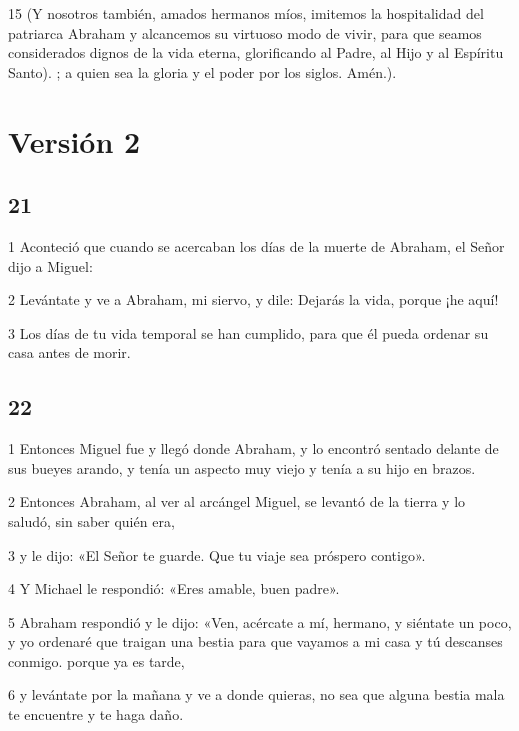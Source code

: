 \par 15 (Y nosotros también, amados hermanos míos, imitemos la hospitalidad del patriarca Abraham y alcancemos su virtuoso modo de vivir, para que seamos considerados dignos de la vida eterna, glorificando al Padre, al Hijo y al Espíritu Santo). ; a quien sea la gloria y el poder por los siglos. Amén.).

\part{Versión 2}

\chapter{21}

\par 1 Aconteció que cuando se acercaban los días de la muerte de Abraham, el Señor dijo a Miguel:

\par 2 Levántate y ve a Abraham, mi siervo, y dile: Dejarás la vida, porque ¡he aquí!

\par 3 Los días de tu vida temporal se han cumplido, para que él pueda ordenar su casa antes de morir.

\chapter{22}

\par 1 Entonces Miguel fue y llegó donde Abraham, y lo encontró sentado delante de sus bueyes arando, y tenía un aspecto muy viejo y tenía a su hijo en brazos.

\par 2 Entonces Abraham, al ver al arcángel Miguel, se levantó de la tierra y lo saludó, sin saber quién era,

\par 3 y le dijo: «El Señor te guarde. Que tu viaje sea próspero contigo».

\par 4 Y Michael le respondió: «Eres amable, buen padre».

\par 5 Abraham respondió y le dijo: «Ven, acércate a mí, hermano, y siéntate un poco, y yo ordenaré que traigan una bestia para que vayamos a mi casa y tú descanses conmigo. porque ya es tarde,

\par 6 y levántate por la mañana y ve a donde quieras, no sea que alguna bestia mala te encuentre y te haga daño.

